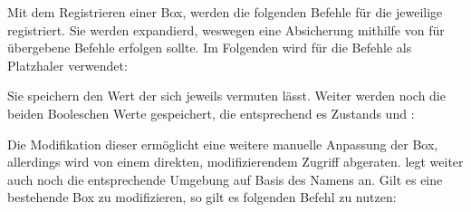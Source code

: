 Mit dem Registrieren einer Box, werden die folgenden Befehle für die jeweilige  registriert. Sie werden expandierd, weswegen eine Absicherung mithilfe von  für übergebene Befehle erfolgen sollte. Im Folgenden wird  für die Befehle als Platzhaler verwendet:

\vspace{-\baselineskip}
\vspace{-\baselineskip}
\vspace{-\baselineskip}
\vspace{-\baselineskip}
\vspace{-\baselineskip}
\vspace{-\baselineskip}
\vspace{-\baselineskip}
\vspace{-\baselineskip}
\vspace{-\baselineskip}
\vspace{-\baselineskip}
\vspace{-\baselineskip}
\vspace{-\baselineskip}
\vspace{-\baselineskip}
\vspace{-\baselineskip}

Sie speichern den Wert der sich jeweils vermuten lässt. Weiter werden noch die beiden Booleschen Werte gespeichert, die entsprechend es Zustands \T{\true} und \T{\false}:\newline
{}\vspace{-\baselineskip}

Die Modifikation dieser ermöglicht eine weitere manuelle Anpassung der Box, allerdings wird von einem direkten, modifizierendem Zugriff abgeraten.  legt weiter auch noch die entsprechende Umgebung auf Basis des Namens an. Gilt es eine bestehende Box zu modifizieren, so gilt es folgenden Befehl zu nutzen:


